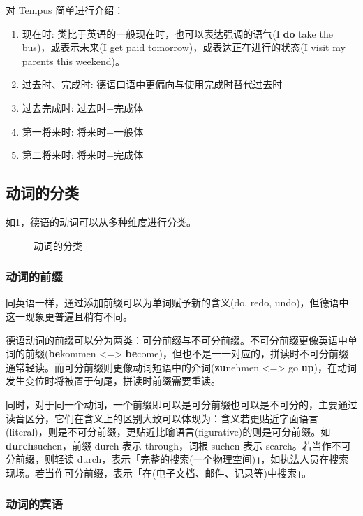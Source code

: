对 Tempus 简单进行介绍：
\begin{enumerate}[leftmargin=3.5em, topsep=0pt, itemsep=0pt, parsep=0pt]
    \item 现在时: 类比于英语的一般现在时，也可以表达强调的语气(I {\bf do} take the bus)，或表示未来(I get paid tomorrow)，或表达正在进行的状态(I visit my parents this weekend)。
    \item 过去时、完成时: 德语口语中更偏向与使用完成时替代过去时
    \item 过去完成时: 过去时+完成体
    \item 第一将来时: 将来时+一般体
    \item 第二将来时: 将来时+完成体
\end{enumerate}

\subsection{动词的分类}

如\cref{fig:verb-categories}，德语的动词可以从多种维度进行分类。

\begin{figure}[H]
    \centering
    
    \caption{动词的分类}
    \label{fig:verb-categories}
\end{figure}

\subsubsection{动词的前缀}

同英语一样，通过添加前缀可以为单词赋予新的含义(do, redo, undo)，但德语中这一现象更普遍且稍有不同。

德语动词的前缀可以分为两类：可分前缀与不可分前缀。不可分前缀更像英语中单词的前缀({\bfseries be}kommen <=> {\bfseries be}come)，但也不是一一对应的，拼读时不可分前缀通常轻读。而可分前缀则更像动词短语中的介词({\bfseries zu}nehmen <=> go {\bfseries up})，在动词发生变位时将被置于句尾，拼读时前缀需要重读。

同时，对于同一个动词，一个前缀即可以是可分前缀也可以是不可分的，主要通过读音区分，它们在含义上的区别大致可以体现为：含义若更贴近字面语言(literal)，则是不可分前缀，更贴近比喻语言(figurative)的则是可分前缀。如 {\bf durch}suchen，前缀 durch 表示 through，词根 suchen 表示 search。若当作不可分前缀，则轻读 durch，表示「完整的搜索(一个物理空间)」，如执法人员在搜索现场。若当作可分前缀，表示「在(电子文档、邮件、记录等)中搜索」。

\subsubsection{动词的宾语}

